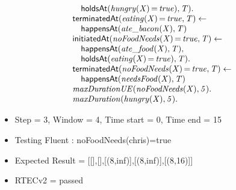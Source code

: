\documentclass[8pt]{beamer}
\DeclareMathOperator{\val}{=}  %
\def \patsize {}
\def\happensAt{\textsf{\patsize happensAt}}
\def\holdsAt{\textsf{\patsize holdsAt}}
\def\initiatedAt{\textsf{\patsize initiatedAt}}
\def\terminatedAt{\textsf{\patsize terminatedAt}}
\newenvironment{mysplit}%
  {\arraycolsep 0pt \begin{array}{l}}%
  {\end{array}}
\begin{document}
\begin{frame}
\begin{minipage}{0.55\linewidth}
\begin{align*}
\begin{mysplit}
                \quad    \holdsAt\mathit{(hungry(X)\val true),T).}\\
                \terminatedAt\mathit{(eating(X)\val true,T)\leftarrow}\\
                \quad    \happensAt\mathit{(ate\_bacon(X),T)}\\
                \initiatedAt\mathit{(noFoodNeeds(X)\val true,T)\leftarrow}\\
                \quad    \happensAt\mathit{(ate\_food(X),T),}\\
                \quad    \holdsAt\mathit{(eating(X)\val true),T).}\\
                \terminatedAt\mathit{(noFoodNeeds(X)\val true,T)\leftarrow}\\
                \quad    \happensAt\mathit{(needsFood(X),T)}\\
                \mathit{maxDurationUE(noFoodNeeds(X),5).}\\
                \mathit{maxDuration(hungry(X),5).}\\
            \end{mysplit}
        \end{align*}
    \end{minipage}
    \begin{itemize}
        \item  Step = 3, Window = 4, Time start = 0, Time end = 15
        \item Testing Fluent :  noFoodNeeds(chris)=true
        \item Expected Result = [[],[],[(8,inf)],[(8,inf)],[(8,16)]]
        \item RTECv2 = passed
    \end{itemize}
\end{frame}
\end{document}
